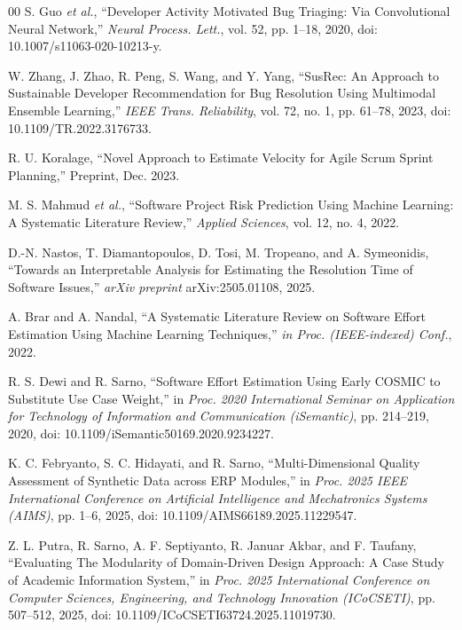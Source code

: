 \documentclass[conference]{IEEEtran}
\begin{document}
\begin{thebibliography}{00}
S. Guo \textit{et al.}, ``Developer Activity Motivated Bug Triaging: Via Convolutional Neural Network,''
\textit{Neural Process. Lett.}, vol. 52, pp. 1--18, 2020,
doi: 10.1007/s11063-020-10213-y.

W. Zhang, J. Zhao, R. Peng, S. Wang, and Y. Yang,
``SusRec: An Approach to Sustainable Developer Recommendation for Bug Resolution Using Multimodal Ensemble Learning,''
\textit{IEEE Trans. Reliability}, vol. 72, no. 1, pp. 61--78, 2023,
doi: 10.1109/TR.2022.3176733.


R. U. Koralage, ``Novel Approach to Estimate Velocity for Agile Scrum Sprint Planning,''
Preprint, Dec. 2023.

M. S. Mahmud \textit{et al.}, ``Software Project Risk Prediction Using Machine Learning: A Systematic Literature Review,''
\textit{Applied Sciences}, vol. 12, no. 4, 2022.

D.-N. Nastos, T. Diamantopoulos, D. Tosi, M. Tropeano, and A. Symeonidis,
``Towards an Interpretable Analysis for Estimating the Resolution Time of Software Issues,''
\textit{arXiv preprint} arXiv:2505.01108, 2025.

A. Brar and A. Nandal,
``A Systematic Literature Review on Software Effort Estimation Using Machine Learning Techniques,''
\textit{in Proc. (IEEE-indexed) Conf.}, 2022.

R. S. Dewi and R. Sarno, ``Software Effort Estimation Using Early COSMIC to Substitute Use Case Weight,''
in \textit{Proc. 2020 International Seminar on Application for Technology of Information and Communication (iSemantic)},
pp. 214--219, 2020, doi: 10.1109/iSemantic50169.2020.9234227.

K. C. Febryanto, S. C. Hidayati, and R. Sarno, ``Multi-Dimensional Quality Assessment of Synthetic Data across ERP Modules,''
in \textit{Proc. 2025 IEEE International Conference on Artificial Intelligence and Mechatronics Systems (AIMS)},
pp. 1--6, 2025, doi: 10.1109/AIMS66189.2025.11229547.

Z. L. Putra, R. Sarno, A. F. Septiyanto, R. Januar Akbar, and F. Taufany,
``Evaluating The Modularity of Domain-Driven Design Approach: A Case Study of Academic Information System,''
in \textit{Proc. 2025 International Conference on Computer Sciences, Engineering, and Technology Innovation (ICoCSETI)},
pp. 507--512, 2025, doi: 10.1109/ICoCSETI63724.2025.11019730.

\end{thebibliography}
\end{document}
